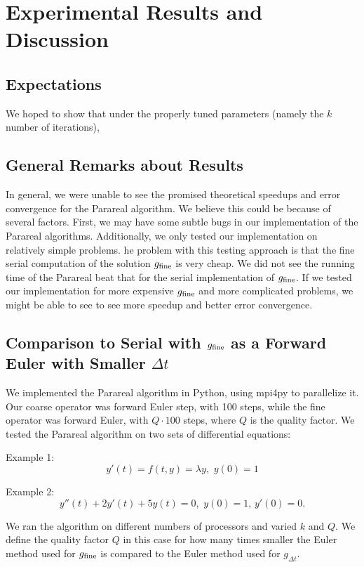 \documentclass[letterpaper,12pt]{article}
\begin{document}
\section{Experimental Results and Discussion}

\subsection{Expectations}
We hoped to show that under the properly tuned parameters (namely the $k$ number of iterations),

\subsection{General Remarks about Results}

In general, we were unable to see the promised theoretical speedups and error
convergence for the Parareal algorithm. We believe this could be because of
several factors. First, we may have some subtle bugs in our implementation of
the Parareal algorithms. Additionally, we only tested our implementation on
relatively simple problems.  he problem with this testing approach is that the
fine serial computation of the solution $g_{\textnormal{fine}}$ is very cheap.
We did not see the running time of the Parareal beat that for the serial
implementation of $g_{\textnormal{fine}}$. If we tested our implementation for
more expensive $g_{\textnormal{fine}}$ and more complicated problems, we might
be able to see to see more speedup and better error convergence. 

\subsection{Comparison to Serial with $g_{\textnormal{fine}}$ as a Forward Euler
with Smaller $\Delta t$}

We implemented the Parareal algorithm in Python, using mpi4py to parallelize it.
Our coarse operator was forward Euler step, with 100 steps, while the fine
operator was forward Euler, with $Q \cdot 100$ steps, where $Q$ is the quality
factor. We tested the Parareal algorithm on two sets of differential equations:

Example 1:
\[
y'(t) = f(t, y) = \lambda y, \, \, y(0) = 1
\]

Example 2:
\[
y''(t) + 2y'(t) + 5y(t) = 0, \, \, y(0) = 1, \, y'(0) = 0.
\]

We ran the algorithm on different numbers of processors and varied $k$ and $Q$.
We define the quality factor $Q$ in this case for how many times smaller the
Euler method used for $g_{\textnormal{fine}}$ is compared to the Euler method
used for $g_{\Delta t}$.
\end{document}
